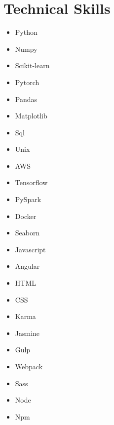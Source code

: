 \documentclass[11pt]{article}
\begin{document}
	\section{Technical Skills}
		\begin{multicols}{4}
			\begin{itemize}[noitemsep]
				
				\item Python 				
				\item Numpy 
				\item Scikit-learn 
				\item Pytorch
				\item Pandas 
				\item Matplotlib
				\columnbreak
				
				\item Sql 
				\item Unix 
				\item AWS
				\item Tensorflow 
				 
				\item PySpark
				\item Docker
				\columnbreak
				
				\item Seaborn 			
				\item Javascript 
				\item Angular 
				\item HTML 
				\item CSS 
				\item Karma 
				\columnbreak 
				
				\item Jasmine 
				\item Gulp 
				\item Webpack
				\item Sass
				\item Node 
				\item Npm 
				\columnbreak 
				
			\end{itemize}
		\end{multicols}
	
\end{document}

